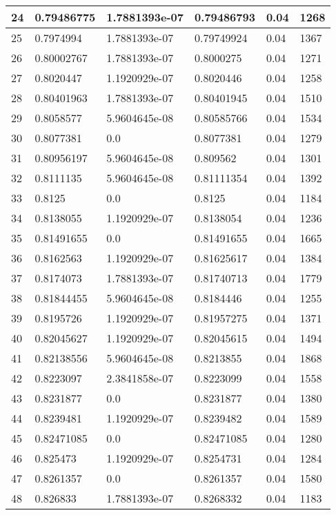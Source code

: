 \begin{longtable}{|l|l|l|l|l|l|}
24 & 0.79486775 & 1.7881393e-07 & 0.79486793 & 0.04 & 1268 \\ \hline 
25 & 0.7974994 & 1.7881393e-07 & 0.79749924 & 0.04 & 1367 \\ \hline 
26 & 0.80002767 & 1.7881393e-07 & 0.8000275 & 0.04 & 1271 \\ \hline 
27 & 0.8020447 & 1.1920929e-07 & 0.8020446 & 0.04 & 1258 \\ \hline 
28 & 0.80401963 & 1.7881393e-07 & 0.80401945 & 0.04 & 1510 \\ \hline 
29 & 0.8058577 & 5.9604645e-08 & 0.80585766 & 0.04 & 1534 \\ \hline 
30 & 0.8077381 & 0.0 & 0.8077381 & 0.04 & 1279 \\ \hline 
31 & 0.80956197 & 5.9604645e-08 & 0.809562 & 0.04 & 1301 \\ \hline 
32 & 0.8111135 & 5.9604645e-08 & 0.81111354 & 0.04 & 1392 \\ \hline 
33 & 0.8125 & 0.0 & 0.8125 & 0.04 & 1184 \\ \hline 
34 & 0.8138055 & 1.1920929e-07 & 0.8138054 & 0.04 & 1236 \\ \hline 
35 & 0.81491655 & 0.0 & 0.81491655 & 0.04 & 1665 \\ \hline 
36 & 0.8162563 & 1.1920929e-07 & 0.81625617 & 0.04 & 1384 \\ \hline 
37 & 0.8174073 & 1.7881393e-07 & 0.81740713 & 0.04 & 1779 \\ \hline 
38 & 0.81844455 & 5.9604645e-08 & 0.8184446 & 0.04 & 1255 \\ \hline 
39 & 0.8195726 & 1.1920929e-07 & 0.81957275 & 0.04 & 1371 \\ \hline 
40 & 0.82045627 & 1.1920929e-07 & 0.82045615 & 0.04 & 1494 \\ \hline 
41 & 0.82138556 & 5.9604645e-08 & 0.8213855 & 0.04 & 1868 \\ \hline 
42 & 0.8223097 & 2.3841858e-07 & 0.8223099 & 0.04 & 1558 \\ \hline 
43 & 0.8231877 & 0.0 & 0.8231877 & 0.04 & 1380 \\ \hline 
44 & 0.8239481 & 1.1920929e-07 & 0.8239482 & 0.04 & 1589 \\ \hline 
45 & 0.82471085 & 0.0 & 0.82471085 & 0.04 & 1280 \\ \hline 
46 & 0.825473 & 1.1920929e-07 & 0.8254731 & 0.04 & 1284 \\ \hline 
47 & 0.8261357 & 0.0 & 0.8261357 & 0.04 & 1580 \\ \hline 
48 & 0.826833 & 1.7881393e-07 & 0.8268332 & 0.04 & 1183 \\ \hline 

\end{longtable}
